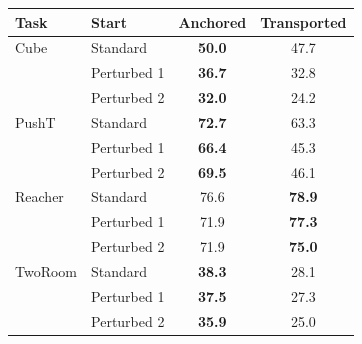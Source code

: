 \begingroup
\setlength{\tabcolsep}{7pt}
\begin{tabular}{ll *{2}{S[table-format=3.1]}}
\toprule
Task & Start & {Anchored} & {Transported} \\
\midrule
Cube & Standard & \bfseries 50.0 & 47.7 \\
 & Perturbed 1 & \bfseries 36.7 & 32.8 \\
 & Perturbed 2 & \bfseries 32.0 & 24.2 \\
\addlinespace
PushT & Standard & \bfseries 72.7 & 63.3 \\
 & Perturbed 1 & \bfseries 66.4 & 45.3 \\
 & Perturbed 2 & \bfseries 69.5 & 46.1 \\
\addlinespace
Reacher & Standard & 76.6 & \bfseries 78.9 \\
 & Perturbed 1 & 71.9 & \bfseries 77.3 \\
 & Perturbed 2 & 71.9 & \bfseries 75.0 \\
\addlinespace
TwoRoom & Standard & \bfseries 38.3 & 28.1 \\
 & Perturbed 1 & \bfseries 37.5 & 27.3 \\
 & Perturbed 2 & \bfseries 35.9 & 25.0 \\
\bottomrule
\end{tabular}
\endgroup
